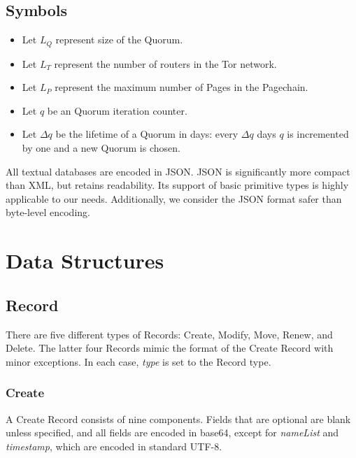 \subsection{Symbols}

\begin{itemize}
	\item Let $ L_{Q} $ represent size of the Quorum.
	\item Let $ L_{T} $ represent the number of routers in the Tor network.
	\item Let $ L_{P} $ represent the maximum number of Pages in the Pagechain.
	\item Let $ q $ be an Quorum iteration counter.
	\item Let $ \Delta q $ be the lifetime of a Quorum in days: every $ \Delta q $ days $ q $ is incremented by one and a new Quorum is chosen.
\end{itemize}

All textual databases are encoded in JSON. JSON is significantly more compact than XML, but retains readability. Its support of basic primitive types is highly applicable to our needs. Additionally, we consider the JSON format safer than byte-level encoding.

\section{Data Structures}
\label{sec:DataStructures}

\subsection{Record}
\label{sec:Record}

There are five different types of Records: Create, Modify, Move, Renew, and Delete. The latter four Records mimic the format of the Create Record with minor exceptions. In each case, \emph{type} is set to the Record type.

\subsubsection{Create}

A Create Record consists of nine components. Fields that are optional are blank unless specified, and all fields are encoded in base64, except for \emph{nameList} and \emph{timestamp}, which are encoded in standard UTF-8.

